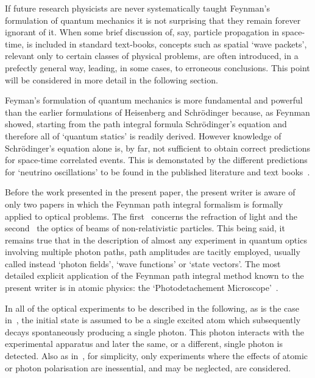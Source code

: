 \documentclass [12pt]{article}
\begin{document}
   If future research physicists are never systematically taught Feynman's formulation
  of quantum mechanics it is not surprising that they remain forever ignorant of it. 
    When some brief discussion of, say, particle
  propagation in space-time, is included in standard text-books, concepts such as
  spatial `wave packets', relevant only to certain classes of physical problems, 
  are often introduced, in a prefectly general way, leading, in some cases, to erroneous conclusions.
  This point will be 
   considered in more detail in the following section. 
  \par Feyman's formulation of quantum mechanics is more fundamental and powerful
   than the earlier formulations of Heisenberg and Schr\"{o}dinger because, as Feynman
   showed, starting from the path integral formula Schr\"{o}dinger's
   equation and therefore all of `quantum statics' is readily derived. However 
    knowledge of  Schr\"{o}dinger's equation alone is, by far, not sufficient to obtain
   correct predictions for space-time correlated events. This is demonstated by the
   different predictions for `neutrino oscillations' to be found in the published 
   literature and text books~\cite{JHF1,JHF2,JHF3}.
   \par Before the work presented in the present paper, the present writer is aware 
   of only two papers in which the Feynman path integral formalism is formally 
   applied to optical problems. The first~\cite{BGdeG} concerns the refraction
   of light and the second~\cite{BB} the optics of beams of non-relativistic particles.
   This being said, it remains true that in the description of almost any experiment in
   quantum optics involving multiple photon paths, path amplitudes are tacitly employed,
   usually called instead `photon fields', `wave functions' or `state vectors'. The most detailed
   explicit application of the Feynman path integral method known to the present 
   writer is in atomic physics: the `Photodetachement Microscope'~\cite{BBD}.
    \par In all of the optical experiments to be described in the following, as is the 
    case in~\cite{Feyn1}, the initial state is assumed to be a single
    excited atom which subsequently decays spontaneously producing a single photon.
    This photon interacts with the experimental apparatus and later the same, 
    or a different, single photon is detected. Also as in~\cite{Feyn1}, for simplicity,
    only experiments where the effects of atomic or photon polarisation are inessential, and 
    may be neglected, are considered.
\end{document}
